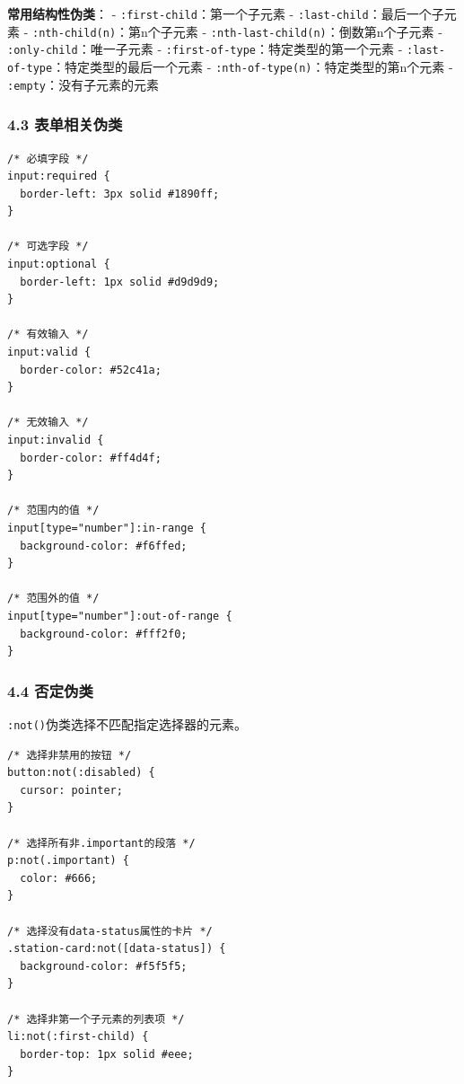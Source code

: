 \textbf{常用结构性伪类}： -
\passthrough{\lstinline!:first-child!}：第一个子元素 -
\passthrough{\lstinline!:last-child!}：最后一个子元素 -
\passthrough{\lstinline!:nth-child(n)!}：第n个子元素 -
\passthrough{\lstinline!:nth-last-child(n)!}：倒数第n个子元素 -
\passthrough{\lstinline!:only-child!}：唯一子元素 -
\passthrough{\lstinline!:first-of-type!}：特定类型的第一个元素 -
\passthrough{\lstinline!:last-of-type!}：特定类型的最后一个元素 -
\passthrough{\lstinline!:nth-of-type(n)!}：特定类型的第n个元素 -
\passthrough{\lstinline!:empty!}：没有子元素的元素

\subsubsection{4.3
表单相关伪类}\label{ux8868ux5355ux76f8ux5173ux4f2aux7c7b}

\begin{lstlisting}
/* 必填字段 */
input:required {
  border-left: 3px solid #1890ff;
}

/* 可选字段 */
input:optional {
  border-left: 1px solid #d9d9d9;
}

/* 有效输入 */
input:valid {
  border-color: #52c41a;
}

/* 无效输入 */
input:invalid {
  border-color: #ff4d4f;
}

/* 范围内的值 */
input[type="number"]:in-range {
  background-color: #f6ffed;
}

/* 范围外的值 */
input[type="number"]:out-of-range {
  background-color: #fff2f0;
}
\end{lstlisting}

\subsubsection{4.4 否定伪类}\label{ux5426ux5b9aux4f2aux7c7b}

\passthrough{\lstinline!:not()!}伪类选择不匹配指定选择器的元素。

\begin{lstlisting}
/* 选择非禁用的按钮 */
button:not(:disabled) {
  cursor: pointer;
}

/* 选择所有非.important的段落 */
p:not(.important) {
  color: #666;
}

/* 选择没有data-status属性的卡片 */
.station-card:not([data-status]) {
  background-color: #f5f5f5;
}

/* 选择非第一个子元素的列表项 */
li:not(:first-child) {
  border-top: 1px solid #eee;
}
\end{lstlisting}

